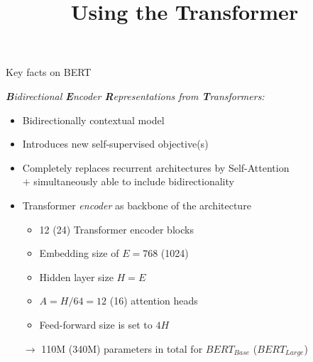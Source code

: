 



\newcommand{\titlefigure}{figure/bert.jpeg}
\newcommand{\learninggoals}{
\item Understand the use of the transformer encoder in this model
\item Understand the architectural components}

\title{Using the Transformer}
\date{}




\begin{vbframe}{Key facts on BERT \href{https://arxiv.org/pdf/1810.04805.pdf}{}}

\vfill

\textit{\textbf{B}idirectional \textbf{E}ncoder \textbf{R}epresentations from \textbf{T}ransformers:}
\begin{itemize}
		\item Bidirectionally contextual model
		\item Introduces new self-supervised objective(s)
		\item Completely replaces recurrent architectures by Self-Attention\\$+$ simultaneously able to include bidirectionality
\end{itemize}

	\begin{itemize}
		\item Transformer \textit{encoder} as backbone of the architecture
			\begin{itemize}
				\item 12 (24) Transformer encoder blocks
				\item Embedding size of $E = 768$ (1024)
				\item Hidden layer size $H = E$
				\item $A = H/64 = 12$ (16) attention heads
				\item Feed-forward size is set to $4H$
			\end{itemize}
			$\rightarrow$ 110M (340M) parameters in total for $BERT_{Base}$ ($BERT_{Large}$)
	\end{itemize}

\vfill

\end{vbframe}

